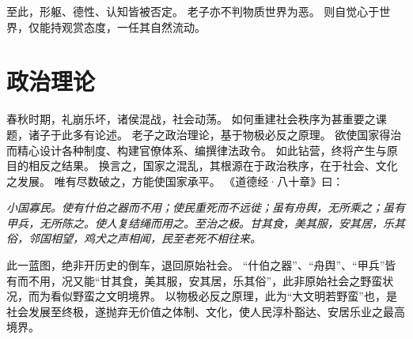 \documentclass[11pt]{article}
\begin{document}
至此，形躯、德性、认知皆被否定。
老子亦不判物质世界为恶。
则自觉心于世界，仅能持观赏态度，一任其自然流动。
  
\section{政治理论}
春秋时期，礼崩乐坏，诸侯混战，社会动荡。
如何重建社会秩序为甚重要之课题，诸子于此多有论述。
老子之政治理论，基于物极必反之原理。
欲使国家得治而精心设计各种制度、构建官僚体系、编撰律法政令。
如此钻营，终将产生与原目的相反之结果。
换言之，国家之混乱，其根源在于政治秩序，在于社会、文化之发展。
唯有尽数破之，方能使国家承平。
《道德经·八十章》曰：

\textit{小国寡民。使有什伯之器而不用；使民重死而不远徙；虽有舟舆，无所乘之；虽有甲兵，无所陈之。使人复结绳而用之。至治之极。甘其食，美其服，安其居，乐其俗，邻国相望，鸡犬之声相闻，民至老死不相往来。}

此一蓝图，绝非开历史的倒车，退回原始社会。
“什伯之器”、“舟舆”、“甲兵”皆有而不用，况又能“甘其食，美其服，安其居，乐其俗”，此非原始社会之野蛮状况，而为看似野蛮之文明境界。
以物极必反之原理，此为“大文明若野蛮”也，是社会发展至终极，遂抛弃无价值之体制、文化，使人民淳朴豁达、安居乐业之最高境界。
\end{document}
